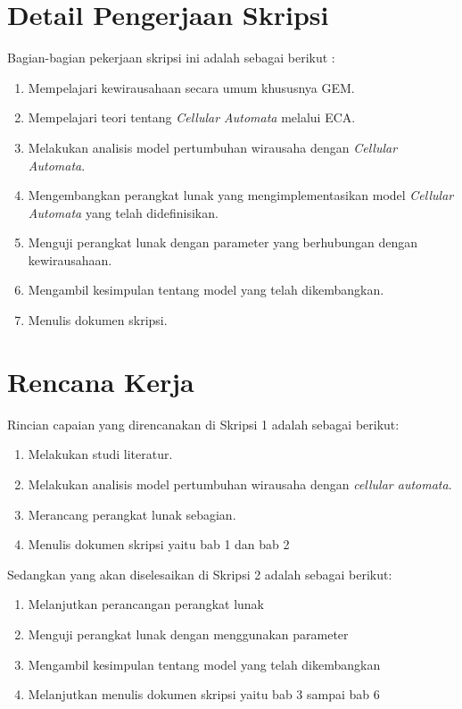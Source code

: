 \documentclass[a4paper,twoside]{article}
\begin{document}
\section{Detail Pengerjaan Skripsi}
Bagian-bagian pekerjaan skripsi ini adalah sebagai berikut :
	\begin{enumerate}
		\item Mempelajari kewirausahaan secara umum khususnya GEM.
		\item Mempelajari teori tentang \textit{Cellular Automata} melalui ECA.
		\item Melakukan analisis model pertumbuhan wirausaha dengan \textit{Cellular Automata}.
		\item Mengembangkan perangkat lunak yang mengimplementasikan model \textit{Cellular Automata} yang telah didefinisikan.
		\item Menguji perangkat lunak dengan parameter yang berhubungan dengan kewirausahaan.
		\item Mengambil kesimpulan tentang model yang telah dikembangkan.
		\item Menulis dokumen skripsi.
	\end{enumerate}

\section{Rencana Kerja}
Rincian capaian yang direncanakan di Skripsi 1 adalah sebagai berikut:
\begin{enumerate}
	\item Melakukan studi literatur.
	\item Melakukan analisis model pertumbuhan wirausaha dengan \textit{cellular automata}.
	\item Merancang perangkat lunak sebagian.
	\item Menulis dokumen skripsi yaitu bab 1 dan bab 2
\end{enumerate}

Sedangkan yang akan diselesaikan di Skripsi 2 adalah sebagai berikut:
\begin{enumerate}
	\item Melanjutkan perancangan perangkat lunak
	\item Menguji perangkat lunak dengan menggunakan parameter
	\item Mengambil kesimpulan tentang model yang telah dikembangkan
	\item Melanjutkan menulis dokumen skripsi yaitu bab 3 sampai bab 6
\end{enumerate}
\end{document}
